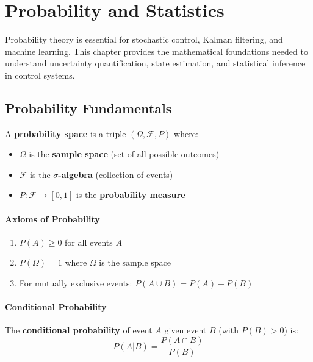 \chapter{Probability and Statistics}
\label{ch:probability}

Probability theory is essential for stochastic control, Kalman filtering, and machine learning. This chapter provides the mathematical foundations needed to understand uncertainty quantification, state estimation, and statistical inference in control systems.

\section{Probability Fundamentals}

\begin{definitionbox}[title=Definition: Probability Space]
A \textbf{probability space} is a triple $(\Omega, \mathcal{F}, P)$ where:
\begin{itemize}
    \item $\Omega$ is the \textbf{sample space} (set of all possible outcomes)
    \item $\mathcal{F}$ is the \textbf{$\sigma$-algebra} (collection of events)
    \item $P: \mathcal{F} \to [0,1]$ is the \textbf{probability measure}
\end{itemize}
\end{definitionbox}

\subsubsection{Axioms of Probability}
\begin{enumerate}
    \item $P(A) \geq 0$ for all events $A$
    \item $P(\Omega) = 1$ where $\Omega$ is the sample space
    \item For mutually exclusive events: $P(A \cup B) = P(A) + P(B)$
\end{enumerate}

\subsubsection{Conditional Probability}

\begin{definitionbox}[title=Definition: Conditional Probability]
The \textbf{conditional probability} of event $A$ given event $B$ (with $P(B) > 0$) is:
\begin{equation}
P(A|B) = \frac{P(A \cap B)}{P(B)}
\end{equation}
\end{definitionbox}

